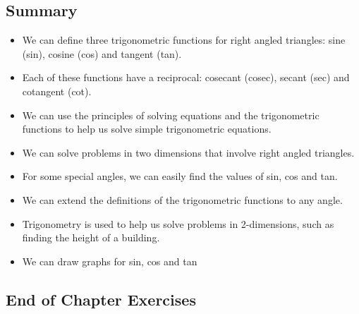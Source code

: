             \subsection{ Summary}
            \nopagebreak
            \label{m39414*eip-197}\begin{itemize}[noitemsep]
            \item We can define three trigonometric functions for right angled triangles: sine (sin), cosine (cos) and tangent (tan).\item Each of these functions have a reciprocal: cosecant (cosec), secant (sec) and cotangent (cot).
\item We can use the principles of solving equations and the trigonometric functions to help us solve simple trigonometric equations.\item We can solve problems in two dimensions that involve right angled triangles.\item For some special angles, we can easily find the values of sin, cos and tan.\item We can extend the definitions of the trigonometric functions to any angle.\item 
Trigonometry is used to help us solve problems in 2-dimensions, such as finding the height of a building.\item 
We can draw graphs for sin, cos and tan\end{itemize}
        \label{m39414*cid8}
            \subsection{ End of Chapter Exercises}
            \nopagebreak
            
